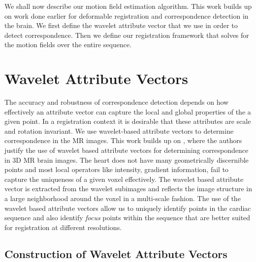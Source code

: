 We shall now describe our motion field estimation algorithm. This work builds up on work done earlier for deformable registration \cite{hammer} and correspondence detection \cite{wav} in the brain. We first define the wavelet attribute vector that we use in order to detect correspondence. Then we define our registration framework that solves for the motion fields over the entire sequence.

\section{Wavelet Attribute Vectors}
\label{sec:wav}

The accuracy and robustness of correspondence detection depends on how effectively an attribute vector can capture the local and global properties of the a given point. In a registration context it is desirable that these attributes are scale and rotation invariant. We use wavelet-based attribute vectors to determine correspondence in the MR images. This work builds up on \cite{wav}, where the authors justify the use of wavelet based attribute vectors for determining correspondence in 3D MR brain images. The heart does not have many geometrically discernible points and most local operators like intensity, gradient information, fail to capture the uniqueness of a given voxel effectively. The wavelet based attribute vector is extracted from the wavelet subimages and reflects the image structure in a large neighborhood around the voxel in a multi-scale fashion. The use of the wavelet based attribute vectors allow us to uniquely identify points in the cardiac sequence and also identify {\em focus} points within the sequence that are better suited for registration at different resolutions.

\subsection{Construction of Wavelet Attribute Vectors}


